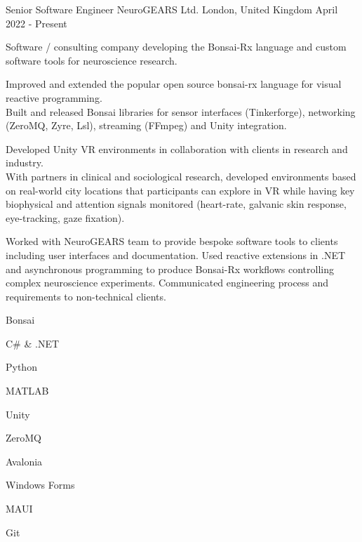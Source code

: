 

\begin{cventries}

  \cventry%
    {Senior Software Engineer} %
    {NeuroGEARS Ltd.} %
    {London, United Kingdom} %
    {April 2022 \-- Present} %
    {
      \begin{cvsentence}Software / consulting company developing the Bonsai-Rx language and custom software tools for neuroscience research.\end{cvsentence}
      \begin{cvitems} %
        \item {Improved and extended the popular open source bonsai-rx language for visual reactive programming.} \\
        Built and released Bonsai libraries for sensor interfaces (Tinkerforge), networking (ZeroMQ, Zyre, Lsl), streaming (FFmpeg) and Unity integration.
        \item {Developed Unity VR environments in collaboration with clients in research and industry.} \\
        With partners in clinical and sociological research, developed environments based on real-world city locations that participants can explore in VR while having key biophysical and attention signals monitored (heart-rate, galvanic skin response, eye-tracking, gaze fixation).
        \item {Worked with NeuroGEARS team to provide bespoke software tools to clients including user interfaces and documentation. Used reactive extensions in .NET and asynchronous programming to produce Bonsai-Rx workflows controlling complex neuroscience experiments. Communicated engineering process and requirements to non-technical clients.}
      \end{cvitems}
    }
    \begin{cventryskills}
      \item Bonsai
      \item C\# \& .NET
      \item Python
      \item MATLAB
      \item Unity
      \item ZeroMQ
      \item Avalonia
      \item Windows Forms
      \item MAUI
      \item Git
    \end{cventryskills}


\end{cventries}
